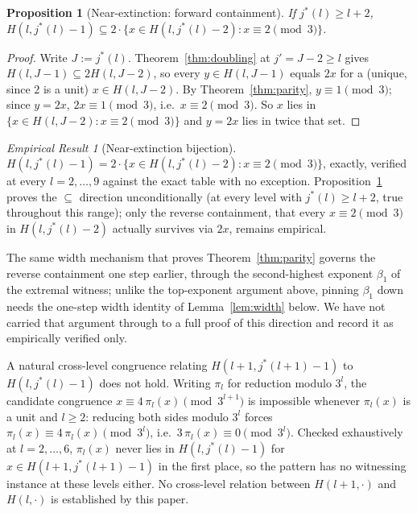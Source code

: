 \documentclass[11pt]{amsart}
\theoremstyle{plain}
\newtheorem{proposition}[theorem]{Proposition}
\theoremstyle{definition}
\theoremstyle{remark}
\newtheorem{empresult}[theorem]{Empirical Result}
\begin{document}
\begin{proposition}[Near-extinction: forward containment]
\label{prop:extinctionfwd}
If $j^*(l)\ge l+2$, $H(l,j^*(l)-1) \subseteq 2\cdot\{x \in H(l,j^*(l)-2) : x\equiv2\!\!\pmod3\}$.
\end{proposition}

\begin{proof}
Write $J:=j^*(l)$. Theorem~\ref{thm:doubling} at $j'=J-2\ge l$ gives $H(l,J-1)\subseteq2H(l,J-2)$, so
every $y\in H(l,J-1)$ equals $2x$ for a (unique, since $2$ is a unit) $x\in H(l,J-2)$. By
Theorem~\ref{thm:parity}, $y\equiv1\pmod3$; since $y=2x$, $2x\equiv1\pmod3$, i.e.\ $x\equiv2\pmod3$.
So $x$ lies in $\{x\in H(l,J-2):x\equiv2\pmod3\}$ and $y=2x$ lies in twice that set.
\end{proof}

\begin{empresult}[Near-extinction bijection]
\label{er:extinction}
$H(l,j^*(l)-1) = 2\cdot\{x \in H(l,j^*(l)-2) : x\equiv2\!\!\pmod3\}$, exactly, verified at every
$l=2,\dots,9$ against the exact table with no exception. Proposition~\ref{prop:extinctionfwd} proves
the $\subseteq$ direction unconditionally (at every level with $j^*(l)\ge l+2$, true throughout this
range); only the reverse containment, that every $x\equiv2\pmod3$ in $H(l,j^*(l)-2)$ actually
survives via $2x$, remains empirical.
\end{empresult}

The same width mechanism that proves Theorem~\ref{thm:parity} governs the reverse containment one
step earlier, through the second-highest exponent $\beta_1$ of the extremal witness; unlike the
top-exponent argument above, pinning $\beta_1$ down needs the one-step width identity of
Lemma~\ref{lem:width} below. We have not carried that argument through to a full proof of this
direction and record it as empirically verified only.

A natural cross-level congruence relating $H(l+1,j^*(l+1)-1)$ to $H(l,j^*(l)-1)$ does not hold.
Writing $\pi_l$ for reduction modulo $3^l$, the candidate congruence $x\equiv4\,\pi_l(x)\pmod{3^{l+1}}$
is impossible whenever $\pi_l(x)$ is a unit and $l\ge2$: reducing both sides modulo $3^l$ forces
$\pi_l(x)\equiv4\,\pi_l(x)\pmod{3^l}$, i.e.\ $3\,\pi_l(x)\equiv0\pmod{3^l}$. Checked exhaustively at
$l=2,\dots,6$, $\pi_l(x)$ never lies in $H(l,j^*(l)-1)$ for $x\in H(l+1,j^*(l+1)-1)$ in the first
place, so the pattern has no witnessing instance at these levels either. No cross-level relation
between $H(l+1,\cdot)$ and $H(l,\cdot)$ is established by this paper.
\end{document}
